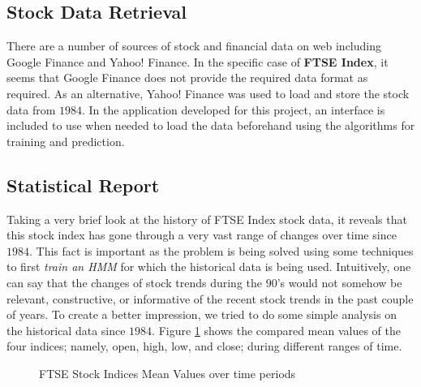 \documentclass{acm_proc_article-sp}
\begin{document}
\subsection{Stock Data Retrieval} \label{sec:data} 
There are a number of sources of stock and financial data on web including Google Finance and Yahoo! Finance. In the
specific case of \textbf{FTSE Index}, it seems that Google Finance does not provide the required data format as
required. As an alternative, Yahoo! Finance was used to load and store the stock data from $1984$. In the application
developed for this project, an interface is included to use when needed to load the data beforehand using the
algorithms for training and prediction.

\subsection{Statistical Report} \label{sec:stats}
Taking a very brief look at the history of FTSE Index stock data, it reveals that this stock index has gone through a
very vast range of changes over time since $1984$. This fact is important as the problem is being solved using some
techniques to first \textit{train an HMM} for which the historical data is being used. Intuitively, one can say that
the changes of stock trends during the $90$'s would not somehow be relevant, constructive, or informative of the recent
stock trends in the past couple of years. To create a better impression, we tried to do some simple analysis on the
historical data since $1984$. Figure \ref{fig:ftse-mean} shows the compared mean values of the four indices; namely, open,
high, low, and close; during different ranges of time.

\begin{figure}[h] 
\centering
\setlength\fboxsep{0.1pt}
\setlength\fboxrule{0.7pt}
\caption{FTSE Stock Indices Mean Values over time periods} \label{fig:ftse-mean}
\end{figure}
\end{document}
